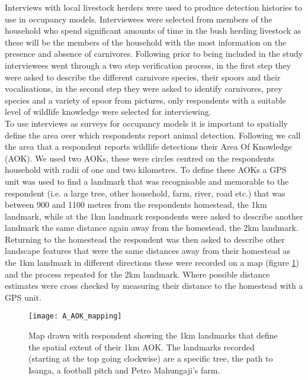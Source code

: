 Interviews with local livestock herders were used to produce detection histories to use in occupancy models. Interviewees were selected from members of the household who spend significant amounts of time in the bush herding livestock as these will be the members of the household with the most information on the presence and absence of carnivores. Following \citet{Zeller2011} prior to being included in the study interviewees went through a two step verification process, in the first step they were asked to describe the different carnivore species, their spoors and their vocalisations, in the second step they were asked to identify carnivores, prey species and a variety of spoor from pictures, only respondents with a suitable level of wildlife knowledge were selected for interviewing.\\

To use interviews as surveys for occupancy models it is important to spatially define the area over which respondents report animal detection. Following \cite{Zeller2011} we call the area that a respondent reports wildlife detections their Area Of Knowledge (AOK). We used two AOKs, these were circles centred on the respondents household with radii of one and two kilometres. To define these AOKs a GPS unit was used to find a landmark that was recognisable and memorable to the respondent (i.e. a large tree, other household, farm, river, road etc.) that was between 900 and 1100 metres from the respondents homestead, the 1km landmark, while at the 1km landmark respondents were asked to describe another landmark the same distance again away from the homestead, the 2km landmark. Returning to the homestead the respondent was then asked to describe other landscape features that were the same distances away from their homestead as the 1km landmark in different directions these were recorded on a map (figure \ref{fig:AOK_map}) and the process repeated for the 2km landmark. Where possible distance estimates were cross checked by measuring their distance to the homestead with a GPS unit.\\

\begin{figure}[htb]
\centering
\texttt{[image: A\_AOK\_mapping]}
\caption{Map drawn with respondent showing the 1km landmarks that define the spatial extent of their 1km AOK. The landmarks recorded (starting at the top going clockwise) are a specific tree, the path to Isanga, a football pitch and Petro Mahungaji's farm.}
\label{fig:AOK_map}
\end{figure}

